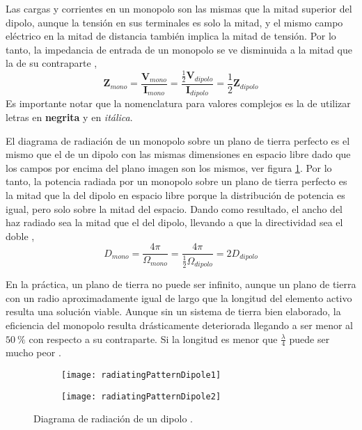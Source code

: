 Las cargas y corrientes en un monopolo son las mismas que la mitad superior del dipolo, aunque la tensión en sus terminales es solo la mitad, y el mismo campo eléctrico en la mitad de distancia también implica la mitad de tensión. Por lo tanto, la impedancia de entrada de un monopolo se ve disminuida a la mitad que la de su contraparte \cite{Stutzman2013},
\begin{equation}
\bm{Z}_{mono} = \dfrac{\bm{V}_{mono}}{\bm{I}_{mono}} = \dfrac{\frac{1}{2}\bm{V}_{dipolo}}{\bm{I}_{dipolo}} = \dfrac{1}{2}\bm{Z}_{dipolo}
\end{equation}
Es importante notar que la nomenclatura para valores complejos es la de utilizar letras en \textbf{negrita} y en \textit{itálica}.

El diagrama de radiación de un monopolo sobre un plano de tierra perfecto es el mismo que el de un dipolo con las mismas dimensiones en espacio libre dado que los campos por encima del plano imagen son los mismos, ver figura \ref{fig:radingPatternDipole}. Por lo tanto, la potencia radiada por un monopolo sobre un plano de tierra perfecto es la mitad que la del dipolo en espacio libre porque la distribución de potencia es igual, pero solo sobre la mitad del espacio. Dando como resultado, el ancho del haz radiado sea la mitad que el del dipolo, llevando a que la directividad sea el doble \cite{Stutzman2013},
\begin{equation}
  D_{mono} = \dfrac{4\pi}{\Omega_{mono}} = \dfrac{4\pi}{\frac{1}{2}\Omega_{dipolo}} = 2D_{dipolo}
\end{equation}

En la práctica, un plano de tierra no puede ser infinito, aunque un plano de tierra con un radio aproximadamente igual de largo que la longitud del elemento activo resulta una solución viable. Aunque sin un sistema de tierra bien elaborado, la eficiencia del monopolo resulta drásticamente deteriorada llegando a ser menor al $\SI{50}{\percent}$ con respecto a su contraparte. Si la longitud es menor que $\frac{\lambda}{4}$ puede ser mucho peor \cite{arrl2007}.

\begin{figure}
  \centering
  \begin{subfigure}[b]{0.4\textwidth}
    \texttt{[image: radiatingPatternDipole1]}
  \end{subfigure}
  \begin{subfigure}[b]{0.4\textwidth}
    \texttt{[image: radiatingPatternDipole2]}
  \end{subfigure}             
  \caption{Diagrama de radiación de un dipolo \cite{arrl2007}.}
  \label{fig:radingPatternDipole}
\end{figure}

